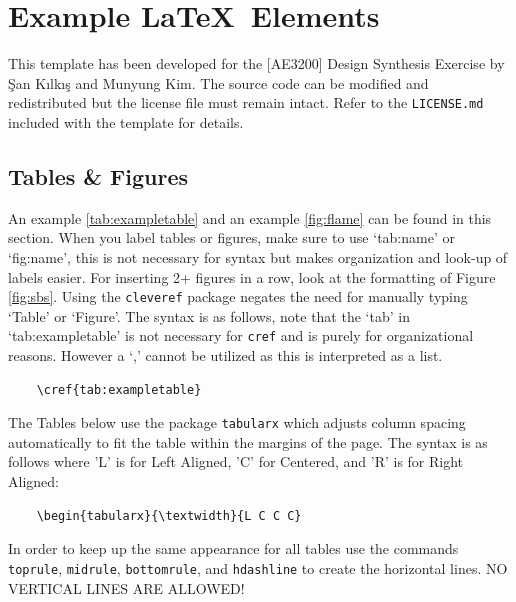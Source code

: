 \chapter{Example \LaTeX\ Elements}
This template has been developed for the [AE3200] Design Synthesis Exercise by
\c{S}an K{\i}lk{\i}\c{s} and Munyung Kim. The source code can be modified and
redistributed but the license file must remain intact. Refer to the
\texttt{LICENSE.md} included with the template for details.

\section{Tables \& Figures}
An example \cref{tab:exampletable} and an example \cref{fig:flame} can be found
in this section. When you label tables or figures, make sure to use `tab:name'
or `fig:name', this is not necessary for syntax but makes organization and
look-up of labels easier. For inserting 2+ figures in a row, look at the
formatting of Figure \cref{fig:sbs}. Using the \texttt{cleveref} package
negates the need for manually typing `Table' or `Figure'. The syntax is as
follows, note that the `tab' in `tab:exampletable' is not necessary for
\texttt{cref} and is purely for organizational reasons. However a `,' cannot be
utilized as this is interpreted as a list.

\begin{verbatim}
    \cref{tab:exampletable}
\end{verbatim}

The Tables below use the package \texttt{tabularx} which adjusts column spacing
automatically to fit the table within the margins of the page. The syntax is as
follows where 'L' is for Left Aligned, 'C' for Centered, and 'R' is for Right
Aligned:

\begin{verbatim}
    \begin{tabularx}{\textwidth}{L C C C}
\end{verbatim}

In order to keep up the same appearance for all tables use the commands
\texttt{toprule}, \texttt{midrule}, \texttt{bottomrule}, and \texttt{hdashline}
to create the horizontal lines. NO VERTICAL LINES ARE ALLOWED!

